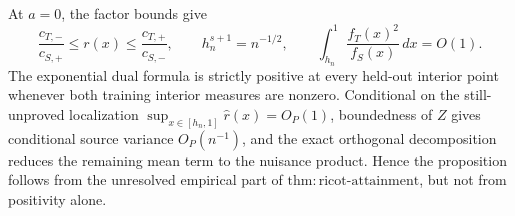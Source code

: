 At \(a=0\), the factor bounds give
\[
\frac{c_{T,-}}{c_{S,+}}\le r(x)\le\frac{c_{T,+}}{c_{S,-}},
\qquad
h_n^{s+1}=n^{-1/2},
\qquad
\int_{h_n}^1\frac{f_T(x)^2}{f_S(x)}\,dx=O(1).
\]
The exponential dual formula is strictly positive at every held-out interior point whenever both training interior measures are nonzero. Conditional on the still-unproved localization \(\sup_{x\in[h_n,1]}\widehat r(x)=O_P(1)\), boundedness of \(Z\) gives conditional source variance \(O_P(n^{-1})\), and the exact orthogonal decomposition reduces the remaining mean term to the nuisance product. Hence the proposition follows from the unresolved empirical part of \(\mathrm{thm:ricot\text{-}attainment}\), but not from positivity alone.